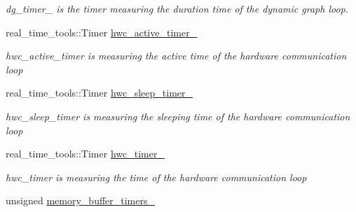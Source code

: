 \begin{DoxyCompactItemize}
\begin{DoxyCompactList}\small\item\em dg\+\_\+timer\+\_\+ is the timer measuring the duration time of the dynamic graph loop. \end{DoxyCompactList}\item 
real\+\_\+time\+\_\+tools\+::\+Timer \hyperlink{classdynamic__graph_1_1DynamicGraphManager_afe6c823bac22d756fc649f911fc1c29b}{hwc\+\_\+active\+\_\+timer\+\_\+}\hypertarget{classdynamic__graph_1_1DynamicGraphManager_afe6c823bac22d756fc649f911fc1c29b}{}\label{classdynamic__graph_1_1DynamicGraphManager_afe6c823bac22d756fc649f911fc1c29b}

\begin{DoxyCompactList}\small\item\em hwc\+\_\+active\+\_\+timer is measuring the active time of the hardware communication loop \end{DoxyCompactList}\item 
real\+\_\+time\+\_\+tools\+::\+Timer \hyperlink{classdynamic__graph_1_1DynamicGraphManager_a89eb402f9e2eaa8dfad090f6c9845f6c}{hwc\+\_\+sleep\+\_\+timer\+\_\+}\hypertarget{classdynamic__graph_1_1DynamicGraphManager_a89eb402f9e2eaa8dfad090f6c9845f6c}{}\label{classdynamic__graph_1_1DynamicGraphManager_a89eb402f9e2eaa8dfad090f6c9845f6c}

\begin{DoxyCompactList}\small\item\em hwc\+\_\+sleep\+\_\+timer is measuring the sleeping time of the hardware communication loop \end{DoxyCompactList}\item 
real\+\_\+time\+\_\+tools\+::\+Timer \hyperlink{classdynamic__graph_1_1DynamicGraphManager_a08ef83c411e5439204fa05b28f8e2794}{hwc\+\_\+timer\+\_\+}\hypertarget{classdynamic__graph_1_1DynamicGraphManager_a08ef83c411e5439204fa05b28f8e2794}{}\label{classdynamic__graph_1_1DynamicGraphManager_a08ef83c411e5439204fa05b28f8e2794}

\begin{DoxyCompactList}\small\item\em hwc\+\_\+timer is measuring the time of the hardware communication loop \end{DoxyCompactList}\item 
unsigned \hyperlink{classdynamic__graph_1_1DynamicGraphManager_a844d4f6c15668884b37111003c8a25a0}{memory\+\_\+buffer\+\_\+timers\+\_\+}\hypertarget{classdynamic__graph_1_1DynamicGraphManager_a844d4f6c15668884b37111003c8a25a0}{}\label{classdynamic__graph_1_1DynamicGraphManager_a844d4f6c15668884b37111003c8a25a0}


\end{DoxyCompactItemize}
